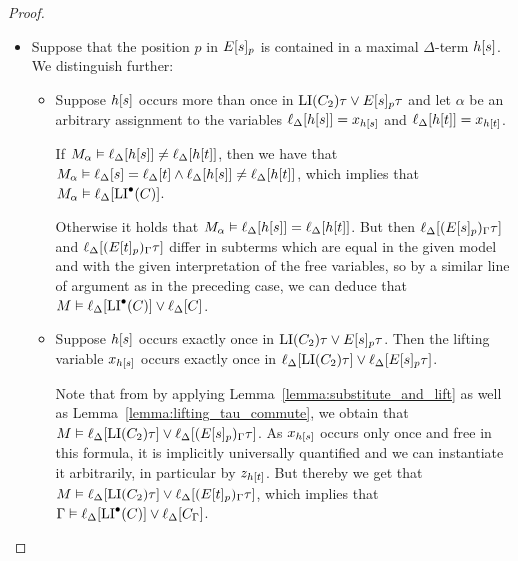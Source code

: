 \begin{proof}
\begin{description}
\begin{itemize}
				\item
					Suppose that the position $p$ in $E{[s]_{p}}$ is contained in a maximal $\Delta$-term $h[s]$.
					We distinguish further:

					\begin{itemize}
						\item Suppose $h[s]$ occurs more than once in $\operatorname{LI}(C_2)\tau \lor E{[s]_{p}}\tau$ and let $\alpha$ be an arbitrary assignment to the variables $\ell_{\Delta}[h[s]] = x_{h[s]}$ and $\ell_{\Delta}[h[t]] = x_{h[t]}$.

							If $M_\alpha \vDash \ell_{\Delta}[h[s]] \neq \ell_{\Delta}[h[t]]$, then we have that $M_\alpha \entails \lifdeltanovar{s}\nolinebreak=\lifdeltanovar{t} \land\allowbreak \lifdeltanovar{h\occ{s}} \neq \lifdeltanovar{h\occ{t}}$, which implies that $M_\alpha \vDash \ell_{\Delta}[\operatorname{LI}^\bullet(C)]$.

							Otherwise it holds that $M_\alpha \vDash \ell_{\Delta}[h[s]] = \ell_{\Delta}[h[t]]$.
							But then 
							$\ell_{\Delta}[(E{[s]_{p}})_\Gamma\tau]$
							and
							$\ell_{\Delta}[(E{[t]_{p}})_\Gamma\tau]$
							differ in subterms which are equal in the given model and with the given interpretation of the free variables,
							so by a similar line of argument as in the preceding case, we can deduce that $M \vDash \ell_{\Delta}[\operatorname{LI}^\bullet(C)] \lor \ell_{\Delta}[C]$.

						\item Suppose $h[s]$ occurs exactly once in $\operatorname{LI}(C_2)\tau \lor E{[s]_{p}}\tau$.
							Then the lifting variable $x_{h[s]}$ 
							occurs exactly once in $\ell_{\Delta}[\operatorname{LI}(C_2)\tau] \lor \ell_{\Delta}[E{[s]_{p}}\tau]$.

							Note that from \markB{} by applying Lemma~\ref{lemma:substitute_and_lift} as well as Lemma~\ref{lemma:lifting_tau_commute}, we obtain that $M\vDash \ell_{\Delta}[\operatorname{LI}(C_2)\tau] \lor \ell_{\Delta}[(E{[s]_{p}})_\Gamma\tau]$.
							As $x_{h[s]}$ occurs only once and free in this formula, it is implicitly universally quantified and we can instantiate it arbitrarily, in particular by $z_{h[t]}$.
							But thereby we get that 
							$M\vDash \ell_{\Delta}[\operatorname{LI}(C_2)\tau] \lor \ell_{\Delta}[(E{[t]_{p}})_\Gamma\tau]$, 
							which implies that
							$\Gamma\vDash \ell_{\Delta}[\operatorname{LI}^\bullet(C)] \lor \ell_{\Delta}[C_\Gamma]$.
					\end{itemize}
			\end{itemize}
	\end{description}



\end{proof}
